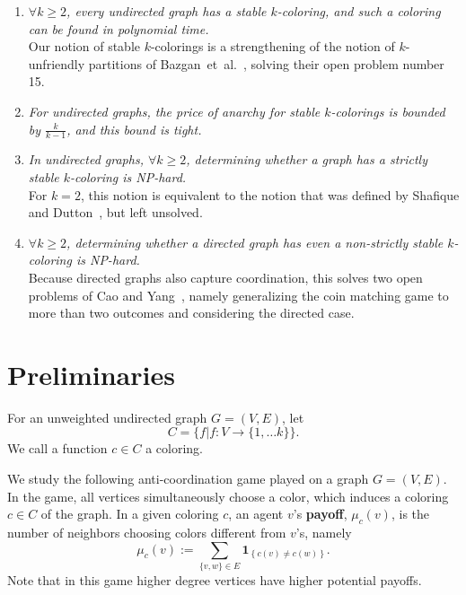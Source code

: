 \documentclass{llncs}
\newcommand{\ind}[1]{\textbf{1}_{\left \{ #1 \right \}}}
\begin{document}
\begin{enumerate}

\item \emph{$\forall k \ge 2$, every undirected graph has a stable $k$-coloring, and
such a coloring can be found in polynomial time.}  \\ 
Our notion of stable $k$-colorings is a strengthening of the notion of $k$-unfriendly partitions of
Bazgan~et~al.~\cite{BazganTV10}, solving their open problem number 15.

\item \emph{For undirected graphs, the price of anarchy for stable $k$-colorings is
bounded by $\frac{k}{k-1}$, and this bound is tight.  }

\item \emph{In undirected
graphs, $\forall k \ge 2$, determining whether a graph has a strictly stable
$k$-coloring is NP-hard.}  \\ 
For $k=2$, this notion is equivalent to the notion
that was defined by Shafique and Dutton~\cite{ShafiqueD09}, but left unsolved.

\item \emph{$\forall k \ge 2$, determining whether a directed graph has even a non-strictly stable
$k$-coloring is NP-hard.}\\  Because directed graphs also capture coordination,
this solves two open problems of Cao and Yang~\cite{CaoY12a}, namely 
generalizing the coin matching game to more than two outcomes and
considering the directed case. %

\end{enumerate}



\section{Preliminaries}

For an unweighted undirected graph $G=(V,E)$, let $$C = \{f | f: V
\to \{1, \ldots k \}\}.$$ We call a function $c \in C$ a coloring.


We study the following anti-coordination game played on a graph $G=(V,E)$.  
In the game, all vertices simultaneously choose a
color, which induces a coloring $c \in C$ of the graph.  In a given coloring
$c$, an agent $v$'s \textbf{payoff}, $\mu_c(v)$, is the number of neighbors
choosing colors different from $v$'s, namely 
\[ 
   \mu_c(v) := \sum_{\{v,w\} \in E} \ind{c(v) \neq c(w)}.  
\] 
Note that in this game higher degree vertices have
higher potential payoffs.
\end{document}
